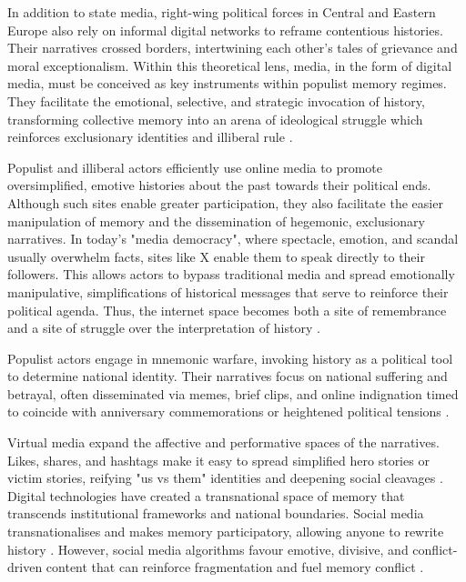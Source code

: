 In addition to state media, right-wing political forces in Central and Eastern Europe also rely on informal digital networks to reframe contentious histories. Their narratives crossed borders, intertwining each other's tales of grievance and moral exceptionalism. Within this theoretical lens, media, in the form of digital media,  must be conceived as key instruments within populist memory regimes. They facilitate the emotional, selective, and strategic invocation of history, transforming collective memory into an arena of ideological struggle which reinforces exclusionary identities and illiberal rule \citep{malksoo_memory_2009}.

Populist and illiberal actors efficiently use online media to promote oversimplified, emotive histories about the past towards their political ends. Although such sites enable greater participation, they also facilitate the easier manipulation of memory and the dissemination of hegemonic, exclusionary narratives. In today's "media democracy", where spectacle, emotion, and scandal usually overwhelm facts, sites like X enable them to speak directly to their followers. This allows actors to bypass traditional media and spread emotionally manipulative, simplifications of historical messages that serve to reinforce their political agenda. Thus, the internet space becomes both a site of remembrance and a site of struggle over the interpretation of history \citep{forchtner_trajectory_2019}.

Populist actors engage in mnemonic warfare, invoking history as a political tool to determine national identity. Their narratives focus on national suffering and betrayal, often disseminated via memes, brief clips, and online indignation timed to coincide with anniversary commemorations or heightened political tensions \citep{bernhard_notitle_2014}.

Virtual media expand the affective and performative spaces of the narratives. Likes, shares, and hashtags make it easy to spread simplified hero stories or victim stories, reifying "us vs them" identities and deepening social cleavages \citep{simko_marking_2020}.  Digital technologies have created a transnational space of memory that transcends institutional frameworks and national boundaries. Social media transnationalises and makes memory participatory, allowing anyone to rewrite history \citep{assmann_transnational_2014}. However, social media algorithms favour emotive, divisive, and conflict-driven content that can reinforce fragmentation and fuel memory conflict \citep{woycicka_mnemonic_2024}.


